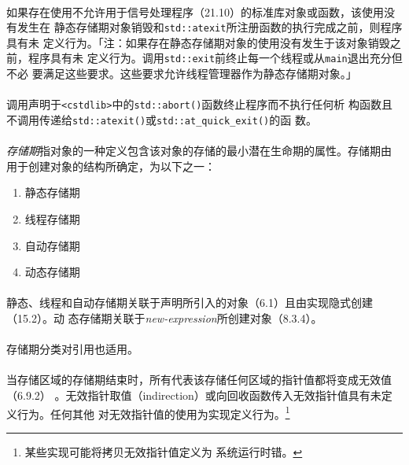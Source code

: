\paragraph{}
如果存在使用不允许用于信号处理程序（21.10）的标准库对象或函数，该使用没有发生在
静态存储期对象销毁和\texttt{std::atexit}所注册函数的执行完成之前，则程序具有未
定义行为。「注：如果存在静态存储期对象的使用没有发生于该对象销毁之前，程序具有未
定义行为。调用\texttt{std::exit}前终止每一个线程或从\texttt{main}退出充分但不必
要满足这些要求。这些要求允许线程管理器作为静态存储期对象。」

\paragraph{}
调用声明于\texttt{<cstdlib>}中的\texttt{std::abort()}函数终止程序而不执行任何析
构函数且不调用传递给\texttt{std::atexit()}或\texttt{std::at\_quick\_exit()}的函
数。


\paragraph{}
\textit{存储期}指对象的一种定义包含该对象的存储的最小潜在生命期的属性。存储期由
用于创建对象的结构所确定，为以下之一：
\begin{enumerate}
  \item{静态存储期}
  \item{线程存储期}
  \item{自动存储期}
  \item{动态存储期}
\end{enumerate}

\paragraph{}
静态、线程和自动存储期关联于声明所引入的对象（6.1）且由实现隐式创建（15.2）。动
态存储期关联于\textit{new-expression}所创建对象（8.3.4）。

\paragraph{}
存储期分类对引用也适用。

\paragraph{}
当存储区域的存储期结束时，所有代表该存储任何区域的指针值都将变成无效值（6.9.2）
。无效指针取值（indirection）或向回收函数传入无效指针值具有未定义行为。任何其他
对无效指针值的使用为实现定义行为。\footnote{某些实现可能将拷贝无效指针值定义为
系统运行时错。}

